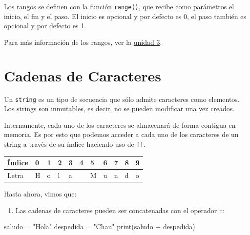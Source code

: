 \documentclass[
  letterpaper,
  DIV=11,
  numbers=noendperiod]{scrreprt}
\newenvironment{Shaded}{\begin{snugshade}}{\end{snugshade}}
\newcommand{\BuiltInTok}[1]{\textcolor[rgb]{0.00,0.23,0.31}{#1}}
\newcommand{\NormalTok}[1]{\textcolor[rgb]{0.00,0.23,0.31}{#1}}
\newcommand{\OperatorTok}[1]{\textcolor[rgb]{0.37,0.37,0.37}{#1}}
\newcommand{\StringTok}[1]{\textcolor[rgb]{0.13,0.47,0.30}{#1}}
\providecommand{\tightlist}{%
  \setlength{\itemsep}{0pt}\setlength{\parskip}{0pt}}\usepackage{longtable,booktabs,array}
\begin{document}
Los rangos se definen con la función \texttt{range()}, que recibe como
parámetros el inicio, el fin y el paso. El inicio es opcional y por
defecto es 0, el paso también es opcional y por defecto es 1.

\begin{tcolorbox}[enhanced jigsaw, colframe=quarto-callout-note-color-frame, opacityback=0, opacitybacktitle=0.6, bottomrule=.15mm, toprule=.15mm, coltitle=black, breakable, colback=white, leftrule=.75mm, titlerule=0mm, bottomtitle=1mm, toptitle=1mm, rightrule=.15mm, title=\textcolor{quarto-callout-note-color}{\faInfo}\hspace{0.5em}{Note}, arc=.35mm, left=2mm, colbacktitle=quarto-callout-note-color!10!white]

Para más información de los rangos, ver la
\protect\hyperlink{ciclo-for}{unidad 3}.

\end{tcolorbox}

\hypertarget{cadenas-de-caracteres}{%
\section{Cadenas de Caracteres}\label{cadenas-de-caracteres}}

Un \texttt{string} es un tipo de secuencia que sólo admite caracteres
como elementos. Los strings son inmutables, es decir, no se pueden
modificar una vez creados.

Internamente, cada uno de los caracteres se almacenará de forma contigua
en memoria. Es por esto que podemos acceder a cada uno de los caracteres
de un string a través de su índice haciendo uso de \texttt{{[}{]}}.

\begin{longtable}[]{@{}lllllllllll@{}}
\toprule\noalign{}
Índice & 0 & 1 & 2 & 3 & 4 & 5 & 6 & 7 & 8 & 9 \\
\midrule\noalign{}
\endhead
\bottomrule\noalign{}
\endlastfoot
Letra & H & o & l & a & & M & u & n & d & o \\
\end{longtable}

Hasta ahora, vimos que:

\begin{enumerate}
\def\labelenumi{\arabic{enumi}.}
\tightlist
\item
  Las cadenas de caracteres pueden ser concatenadas con el operador
  \texttt{+}:
\end{enumerate}

\begin{Shaded}
\begin{Highlighting}[]
\NormalTok{saludo }\OperatorTok{=} \StringTok{"Hola"}
\NormalTok{despedida }\OperatorTok{=} \StringTok{"Chau"}
\BuiltInTok{print}\NormalTok{(saludo }\OperatorTok{+}\NormalTok{ despedida)}
\end{Highlighting}
\end{Shaded}
\end{document}
